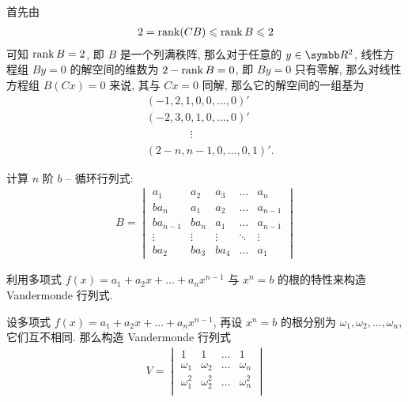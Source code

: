 \begin{exercise}[series=exer]
\begin{answer}
        首先由
        \begin{align*}
            2 = \rank(CB) \leqslant \rank B \leqslant 2
        \end{align*} 
        可知 $ \rank B = 2 $, 即 $ B $ 是一个列满秩阵, 那么对于任意的 $ y \in \R^{2} $, 线性方程组 $ By = 0 $ 的解空间的维数为 $ 2 - \rank B = 0 $, 即 $ By = 0 $ 只有零解, 那么对线性方程组 $ B(Cx) = 0 $ 来说, 其与 $ Cx = 0 $ 同解, 那么它的解空间的一组基为
        \begin{align*}
            & (-1, 2, 1, 0, 0, \dots, 0)'\\
            & (-2, 3, 0, 1, 0, \dots, 0)'\\
            & \phantom{(-2, 3, 0, } \vdots \\
            & (2 - n, n - 1, 0, \dots, 0, 1)'.
        \end{align*}
    \end{answer}
    \item  计算 $ n $ 阶 $ b $ -- 循环行列式:
    \begin{align*}
        B = \begin{vmatrix}
            a_{1}   & a_{2} & a_{3} & \ldots    & a_{n} \\
            ba_{n}  & a_{1} & a_{2} & \ldots    & a_{n-1} \\
            ba_{n-1}    & ba_{n}    & a_{1} & \ldots & a_{n-1} \\
            \vdots  & \vdots & \vdots & \ddots & \vdots \\
            ba_{2} & ba_{3} & ba_{4} & \ldots & a_{1}
        \end{vmatrix}
    \end{align*}
    \begin{hint}
        利用多项式 $ f(x) = a_{1} + a_{2}x + \dots + a_{n}x^{n-1} $ 与 $ x^{n} = b $ 的根的特性来构造 Vandermonde 行列式. 
    \end{hint}
    \begin{answer}
        设多项式 $ f(x) = a_{1} + a_{2}x + \dots + a_{n}x^{n-1} $, 再设 $ x^{n} = b $ 的根分别为 $ \omega_{1}, \omega_{2}, \dots, \omega_{n} $, 它们互不相同. 那么构造 Vandermonde 行列式
        \begin{align*}
            V = \begin{vmatrix}
                1 & 1 & \dots & 1\\
                \omega_{1} & \omega_{2} & \dots & \omega_{n}\\
                \omega_{1}^{2} & \omega_{2}^{2} & \dots & \omega_{n}^{2}\\

\end{vmatrix}
\end{align*}
\end{answer}
\end{exercise}
